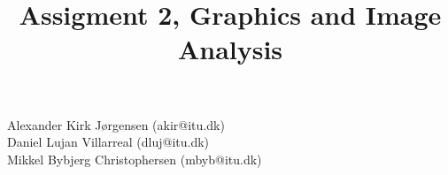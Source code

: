 \documentclass{article}
\title{Assigment 2, Graphics and Image Analysis}
\begin{document}
	\maketitle
	\begin{center}
	Alexander Kirk Jørgensen (akir@itu.dk)\\
	Daniel Lujan Villarreal (dluj@itu.dk)\\
	Mikkel Bybjerg Christophersen (mbyb@itu.dk)\\
		
	\newpage
	\tableofcontents
	\newpage
	\end{center}
	
	
	
\end{document}

